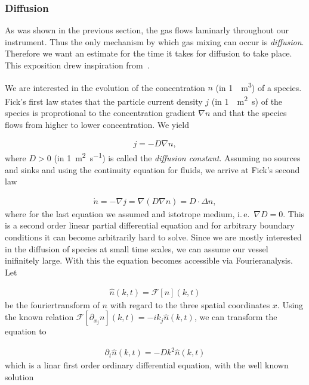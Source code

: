 \subsubsection{Diffusion}
\label{sec:diffusion}

As was shown in the previous section, the gas flows laminarly
throughout our instrument. Thus the only mechanism by which gas mixing
can occur is \emph{diffusion}. Therefore we want an estimate for the
time it takes for diffusion to take place. This exposition drew
inspiration from~\cite{fluid}.

We are interested in the evolution of the concentration $n$ (in
\SI{1}{\per\cubic\meter}) of a species. Fick's first law states that the
particle current density $j$ (in \SI{1}{\per\square\meter\second}) of the
species is proprotional to the concentration gradient $\nabla n$ and
that the species flows from higher to lower concentration. We yield

\begin{align*}
  j = - D \nabla n,
\end{align*}
where $D > 0$ (in \SI{1}{\square\meter\per\second}) is called the
\emph{diffusion constant}. Assuming no sources and sinks and using the
continuity equation for fluids, we arrive at Fick's second law

\begin{align*}
  \dot n = - \nabla j = \nabla (D \nabla n) = D \cdot \Delta n,
\end{align*}
where for the last equation we assumed and istotrope medium, i.\,e.\
$\nabla D = 0$. This is a second order linear partial differential
equation and for arbitrary boundary conditions it can become
arbitrarily hard to solve. Since we are mostly interested in the
diffusion of species at small time scales, we can assume our vessel
inifinitely large. With this the equation becomes accessible via
Fourieranalysis. Let

\begin{align*}
  \hat n(k,t) = \mathcal{F}[n](k,t)
\end{align*}
be the fouriertransform of $n$ with regard to the three spatial
coordinates $x$. Using the known relation $\mathcal{F}[\partial_{x_j}
n](k,t) = -ik_j \hat n(k,t)$, we can transform the equation to

\begin{align*}
  \partial_t \hat n(k,t) =  - Dk^2 \hat n(k,t)
\end{align*}
which is a linar first order ordinary differential equation, with the
well known solution


